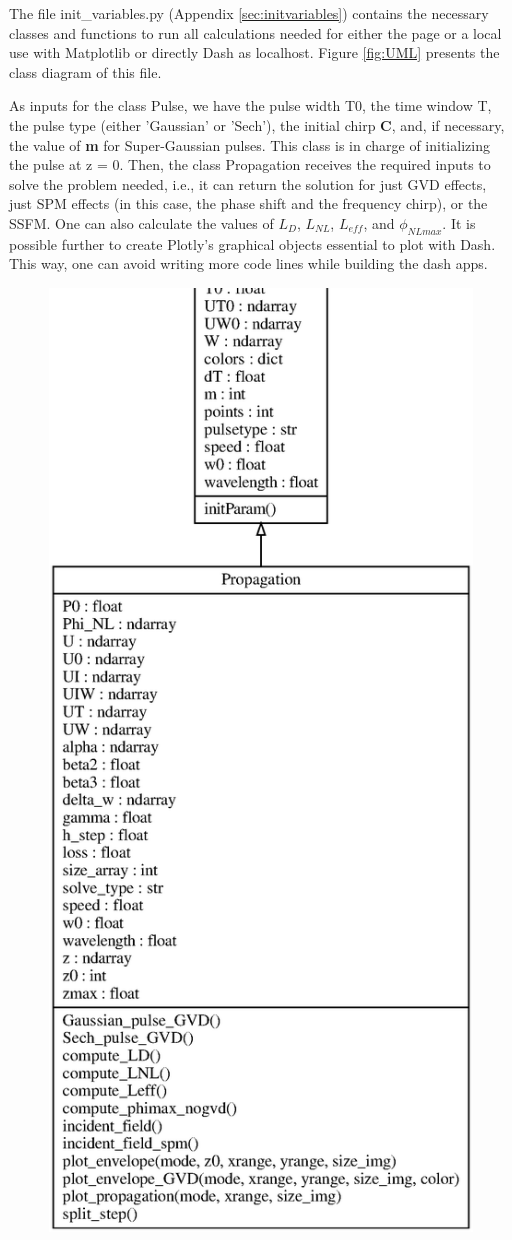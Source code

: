      The file init\_variables.py (Appendix \ref{sec:initvariables}) contains the necessary classes and functions to run all calculations needed for either the page or a local use with Matplotlib or directly Dash as localhost. Figure \ref{fig:UML} presents the class diagram of this file. 

    As inputs for the class Pulse, we have the pulse width T0, the time window T, the pulse type (either 'Gaussian' or 'Sech'), the initial chirp \textbf{C}, and, if necessary, the value of \textbf{m} for Super-Gaussian pulses. This class is in charge of initializing the pulse at z = 0. Then, the class Propagation receives the required inputs to solve the problem needed, i.e., it can return the solution for just GVD effects, just SPM effects (in this case, the phase shift and the frequency chirp), or the SSFM. One can also calculate the values of $L_D$, $L_{NL}$, $L_{eff}$, and $\phi_{NLmax}$. It is possible further to create Plotly's graphical objects essential to plot with Dash. This way, one can avoid writing more code lines while building the dash apps. 
    
    \begin{figure}[label={fig:UML}, caption={Class Diagram of init\_variables.py}]	\includegraphics[width=.6\textwidth]{figures/chap3/init_variables.eps} 
        \end{figure}
    
